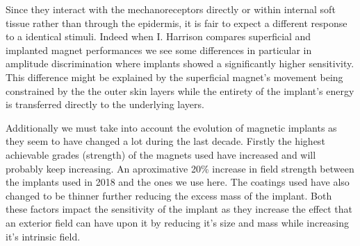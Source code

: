 \documentclass[10pt,journal,compsoc]{IEEEtran}
\begin{document}
Since they interact with the mechanoreceptors directly or within internal soft tissue rather than through the epidermis, it is fair to expect a different response to a identical stimuli. Indeed when I. Harrison \cite{harrison2018tf} compares superficial and implanted magnet performances we see some differences in particular in amplitude discrimination where implants showed a significantly higher sensitivity. This difference might be explained by the superficial magnet's movement being constrained by the the outer skin layers while the entirety of the implant's energy is transferred directly to the underlying layers. 

Additionally we must take into account the evolution of magnetic implants as they seem to have changed a lot during the last decade. Firstly the highest achievable grades (strength) of the magnets used have increased and will probably keep increasing. An aproximative 20\% increase in field strength between the implants used in 2018 \cite{harrison2018tf} and the ones we use here. The coatings used have also changed to be thinner further reducing the excess mass of the implant. Both these factors impact the sensitivity of the implant as they increase the effect that an exterior field can have upon it by reducing it's size and mass while increasing it's intrinsic field.



	
\end{document}

